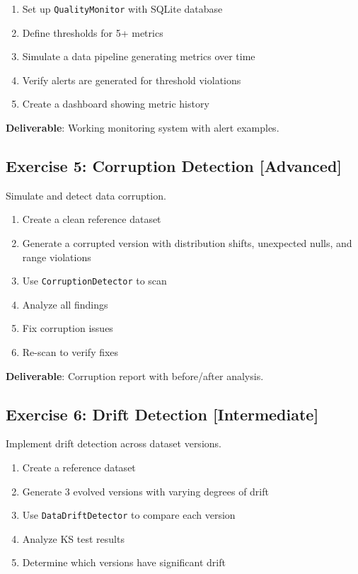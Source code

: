 \begin{enumerate}
    \item Set up \texttt{QualityMonitor} with SQLite database
    \item Define thresholds for 5+ metrics
    \item Simulate a data pipeline generating metrics over time
    \item Verify alerts are generated for threshold violations
    \item Create a dashboard showing metric history
\end{enumerate}

\textbf{Deliverable}: Working monitoring system with alert examples.

\subsection{Exercise 5: Corruption Detection [Advanced]}

Simulate and detect data corruption.

\begin{enumerate}
    \item Create a clean reference dataset
    \item Generate a corrupted version with distribution shifts, unexpected nulls, and range violations
    \item Use \texttt{CorruptionDetector} to scan
    \item Analyze all findings
    \item Fix corruption issues
    \item Re-scan to verify fixes
\end{enumerate}

\textbf{Deliverable}: Corruption report with before/after analysis.

\subsection{Exercise 6: Drift Detection [Intermediate]}

Implement drift detection across dataset versions.

\begin{enumerate}
    \item Create a reference dataset
    \item Generate 3 evolved versions with varying degrees of drift
    \item Use \texttt{DataDriftDetector} to compare each version
    \item Analyze KS test results
    \item Determine which versions have significant drift
\end{enumerate}

